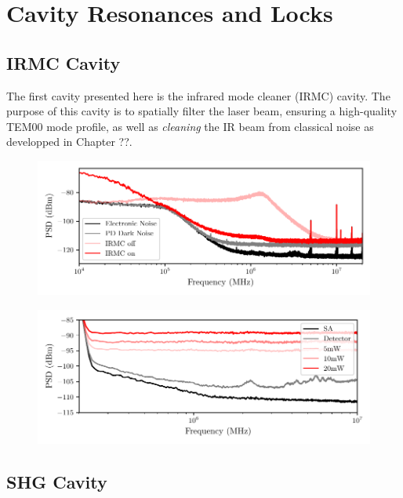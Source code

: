 \section{Cavity Resonances and Locks}

\subsection{IRMC Cavity}
The first cavity presented here is the infrared mode cleaner (IRMC) cavity. The purpose of this cavity is to spatially filter the laser beam, ensuring a high-quality TEM00 mode profile, as well as \textit{cleaning} the IR beam from classical noise as developped in Chapter ??. 


\begin{figure}[h!]
    \centering  
    \includegraphics[width=\textwidth]{./chap6/fig/NoiseIRMC.pdf}
    \caption{}
    \label{fig:irmcnoise}
\end{figure}

\begin{figure}[h!]
    \centering  
    \includegraphics[width=\textwidth]{./chap6/fig/NoiseLO.pdf}
    \caption{}
    \label{fig:irmcnoise}
\end{figure}


\subsection{SHG Cavity}


